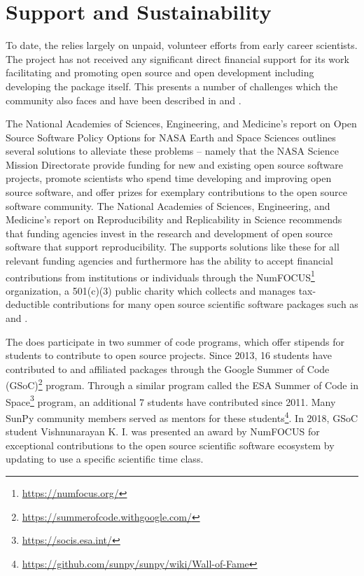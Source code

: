 \section{Support and Sustainability}
\label{sec:support}

To date, the \sunpyproj relies largely on unpaid, volunteer efforts from early career scientists.
The project has not received any significant direct financial support for its work facilitating and promoting open source and open development including developing the \sunpypkg package itself.
This presents a number of challenges which the \astropy community also faces and have been described in \cite{PriceWhelan:2018ji} and \cite{Muna2016}.

The National Academies of Sciences, Engineering, and Medicine's report on Open Source Software Policy Options for NASA Earth and Space Sciences \citep{NAP2018} outlines several solutions to alleviate these problems -- namely that the NASA Science Mission Directorate provide funding for new and existing open source software projects, promote scientists who spend time developing and improving open source software, and offer prizes for exemplary contributions to the open source software community.
The National Academies of Sciences, Engineering, and Medicine's report on Reproducibility and Replicability in Science \citep{NAP2019} recommends that funding agencies invest in the research and development of open source software that support reproducibility.
The \sunpyproj supports solutions like these for all relevant funding agencies and furthermore has the ability to accept financial contributions from institutions or individuals through the NumFOCUS\footnote{\url{https://numfocus.org/}} organization, a 501(c)(3) public charity which collects and manages tax-deductible contributions for many open source scientific software packages such as \numpy and \astropy.

The \sunpyproj does participate in two summer of code programs, which offer stipends for students to contribute to open source projects.
Since 2013, 16 students have contributed to \sunpypkg and affiliated packages through the Google Summer of Code (GSoC)\footnote{\url{https://summerofcode.withgoogle.com/}} program.
Through a similar program called the ESA Summer of Code in Space\footnote{\url{https://socis.esa.int/}} program, an additional 7 students have contributed since 2011.
Many SunPy community members served as mentors for these students\footnote{\url{https://github.com/sunpy/sunpy/wiki/Wall-of-Fame}}.
In 2018, GSoC student Vishnunarayan K. I. was presented an award by NumFOCUS for exceptional contributions to the open source scientific software ecosystem by updating \sunpypkg to use a specific scientific time class.
